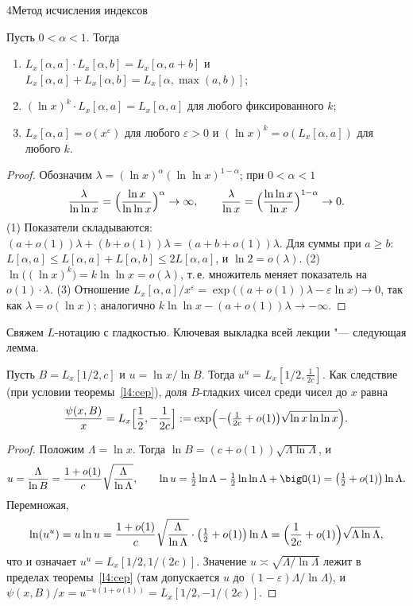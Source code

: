 \begin{lecture}{4}{Метод исчисления индексов}
\begin{lemma}\label{l4:Lprops}
Пусть $0 < \alpha < 1$. Тогда
\begin{enumerate}
  \item $L_x[\alpha, a] \cdot L_x[\alpha, b] = L_x[\alpha, a + b]$ и
    $L_x[\alpha, a] + L_x[\alpha, b] = L_x[\alpha, \max(a, b)]$;
  \item $(\ln x)^{k} \cdot L_x[\alpha, a] = L_x[\alpha, a]$ для любого фиксированного $k$;
  \item $L_x[\alpha, a] = o(x^{\varepsilon})$ для любого $\varepsilon > 0$ и
    $(\ln x)^{k} = o(L_x[\alpha, a])$ для любого $k$.
\end{enumerate}
\end{lemma}

\begin{proof}
Обозначим $\lambda = (\ln x)^{\alpha}(\ln\ln x)^{1 - \alpha}$; при $0 < \alpha < 1$
\[
  \frac{\lambda}{\ln\ln x} = \Bigl(\frac{\ln x}{\ln\ln x}\Bigr)^{\alpha} \to \infty, \qquad
  \frac{\lambda}{\ln x} = \Bigl(\frac{\ln\ln x}{\ln x}\Bigr)^{1 - \alpha} \to 0.
\]
(1) Показатели складываются: $(a + o(1))\lambda + (b + o(1))\lambda = (a + b + o(1))\lambda$.
Для суммы при $a \ge b$:
$L[\alpha, a] \le L[\alpha, a] + L[\alpha, b] \le 2 L[\alpha, a]$, и $\ln 2 = o(\lambda)$.
(2) $\ln\bigl((\ln x)^k\bigr) = k \ln\ln x = o(\lambda)$, т.\,е. множитель меняет показатель
на $o(1) \cdot \lambda$. (3) Отношение $L_x[\alpha, a] / x^{\varepsilon} =
\exp\bigl((a + o(1))\lambda - \varepsilon \ln x\bigr) \to 0$, так как $\lambda = o(\ln x)$;
аналогично $k \ln\ln x - (a + o(1))\lambda \to -\infty$.
\end{proof}

Свяжем $L$-нотацию с гладкостью. Ключевая выкладка всей лекции "--- следующая лемма.

\begin{lemma}\label{l4:uu}
Пусть $B = L_x[1/2, c]$ и $u = \ln x / \ln B$. Тогда $u^{u} = L_x[1/2, \tfrac{1}{2c}]$. Как
следствие (при условии теоремы~\ref{l4:cep}), доля $B$-гладких чисел среди чисел до $x$ равна
\[
  \frac{\psi(x, B)}{x} = L_x\Bigl[\frac12, -\frac{1}{2c}\Bigr]
  := \exp\Bigl(-\bigl(\tfrac{1}{2c} + o(1)\bigr)\sqrt{\ln x \ln\ln x}\Bigr).
\]
\end{lemma}

\begin{proof}
Положим $\Lambda = \ln x$. Тогда $\ln B = (c + o(1))\sqrt{\Lambda \ln \Lambda}$, и
\[
  u = \frac{\Lambda}{\ln B} = \frac{1 + o(1)}{c}\sqrt{\frac{\Lambda}{\ln \Lambda}}, \qquad
  \ln u = \tfrac12 \ln\Lambda - \tfrac12 \ln\ln\Lambda + \bigO(1) = \bigl(\tfrac12 + o(1)\bigr)\ln\Lambda.
\]
Перемножая,
\[
  \ln(u^u) = u \ln u = \frac{1 + o(1)}{c}\sqrt{\frac{\Lambda}{\ln\Lambda}} \cdot
  \bigl(\tfrac12 + o(1)\bigr) \ln\Lambda = \Bigl(\frac{1}{2c} + o(1)\Bigr)\sqrt{\Lambda \ln\Lambda},
\]
что и означает $u^u = L_x[1/2, 1/(2c)]$. Значение $u \asymp \sqrt{\Lambda / \ln\Lambda}$ лежит в
пределах теоремы~\ref{l4:cep} (там допускается $u$ до $(1 - \varepsilon)\Lambda / \ln\Lambda$), и
$\psi(x, B)/x = u^{-u(1 + o(1))} = L_x[1/2, -1/(2c)]$.
\end{proof}


\end{lecture}
